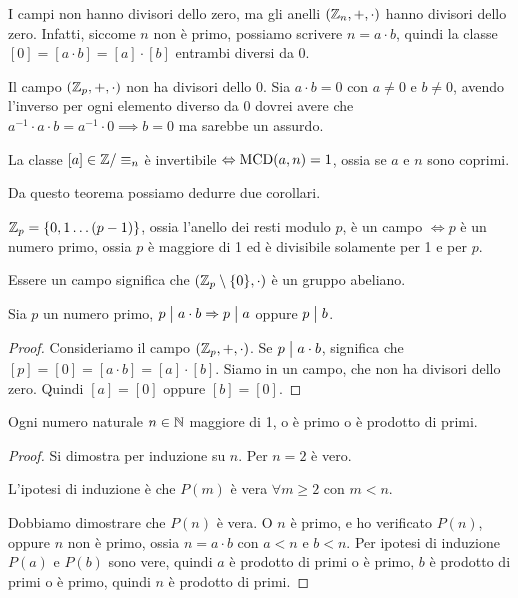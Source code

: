 I campi non hanno divisori dello zero, ma gli anelli $(\mathbb{Z}_n, +, \cdot)$ hanno divisori dello zero. Infatti, siccome $n$ non \`e primo, possiamo scrivere $n = a \cdot b$, quindi la classe $[0] = [a \cdot b] = [a] \cdot [b]$ entrambi diversi da 0.

Il campo $(\mathbb{Z}_p, +, \cdot)$ non ha divisori dello 0. Sia $a \cdot  b = 0$ con $a \neq 0$ e $b \neq 0$, avendo l'inverso per ogni elemento diverso da 0 dovrei avere che $a^{-1} \cdot a \cdot b = a^{-1} \cdot 0 \implies b = 0$ ma sarebbe un assurdo.

\begin{theorem}
La classe $[a] \in \mathbb{Z} / \equiv_n$ \`e invertibile $\Leftrightarrow \operatorname{MCD}(a, n) = 1$, ossia se $a$ e $n$ sono coprimi.
\end{theorem}

Da questo teorema possiamo dedurre due corollari.

\begin{cor}\label{corollario_interi_primo}
$\mathbb{Z}_p = \{ 0, 1 \dots (p-1) \}$, ossia l'anello dei resti modulo $p$, \`e un campo $\iff p$ \`e un numero primo, ossia $p$ \`e maggiore di 1 ed \`e divisibile solamente per 1 e per $p$.

Essere un campo significa che $(\mathbb{Z}_p \setminus \{ 0 \}, \cdot)$ \`e un gruppo abeliano.
\end{cor}
\begin{cor}\label{corollario_interi_secondo}
Sia $p$ un numero primo, $p \bigm| a \cdot b \Rightarrow p \bigm| a $ oppure $ p \bigm| b$.
\end{cor}

\begin{proof}
Consideriamo il campo $(\mathbb{Z}_p, +, \cdot)$. Se $p \bigm| a \cdot b$, significa che $[p] = [0] = [a \cdot b] = [a] \cdot [b]$. Siamo in un campo, che non ha divisori dello zero. Quindi $[a] = [0]$ oppure $[b] = [0]$.
\end{proof}

\begin{prop}
Ogni numero naturale $n \in \mathbb{N}$ maggiore di 1, o \`e primo o \`e prodotto di primi.
\end{prop}
\begin{proof}
Si dimostra per induzione su $n$. Per $n = 2$ \`e vero.

L'ipotesi di induzione \`e che $P(m)$ \`e vera $\forall m \ge 2$ con $m < n$. 

Dobbiamo dimostrare che $P(n)$ \`e vera. O $n$ \`e primo, e ho verificato $P(n)$, oppure $n$ non \`e primo, ossia $n = a \cdot b$ con $a < n$ e $b < n$. Per ipotesi di induzione $P(a)$ e $P(b)$ sono vere, quindi $a$ \`e prodotto di primi o \`e primo, $b$ \`e prodotto di primi o \`e primo, quindi $n$ \`e prodotto di primi.
\end{proof}

